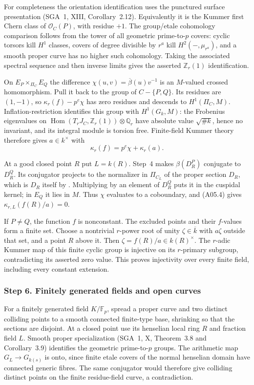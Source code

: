 \documentclass[11pt,a4paper]{article}
\begin{document}
For completeness the orientation identification uses the
punctured surface presentation (SGA~1, XIII, Corollary~2.12).
Equivalently it is the Kummer first Chern class of
$\mathcal O_C(P)$, with residue $+1$. The group/etale
cohomology comparison follows from the tower of all geometric
prime-to-$p$ covers: cyclic torsors kill $H^1$ classes, covers
of degree divisible by $r^a$ kill $H^2(-,\mu_{r^a})$, and a
smooth proper curve has no higher such cohomology. Taking the
associated spectral sequence and then inverse limits gives
the asserted $\mathbb Z_r(1)$ identification.

On $E_P\times_{\Pi_C}E_Q$ the difference
$\chi(u,v)=\overline\beta(u)v^{-1}$ is an $M$-valued
crossed homomorphism. Pull it back to the group of
$C-\{P,Q\}$. Its residues are $(1,-1)$, so
$\kappa_r(f)-p^e\chi$ has zero residues and descends to
$H^1(\Pi_C,M)$. Inflation-restriction identifies this group
with $H^1(G_k,M)$: the Frobenius eigenvalues on
$\operatorname{Hom}(T_rJ_C,\mathbb Z_r(1))\otimes\mathbb Q_r$
have absolute value $\sqrt{\#k}$, hence no invariant, and its
integral module is torsion free. Finite-field Kummer theory
therefore gives $a\in k^\times$ with
\[
 \kappa_r(f)=p^e\chi+\kappa_r(a). \tag{A05.4}
\]

At a good closed point $R$ put $L=k(R)$. Step~4 makes
$\beta(D_R^P)$ conjugate to $D_R^Q$. Its conjugator projects
to the normalizer in $\Pi_{C_L}$ of the proper section $D_R$, which is $D_R$
itself by \cite[Lemma~1.7]{ST2009}. Multiplying by an element
of $D_R^Q$ puts it in the cuspidal kernel; in $E_Q$ it lies
in $M$. Thus $\chi$ evaluates to a coboundary, and (A05.4)
gives $\kappa_{r,L}(f(R)/a)=0$.

If $P\ne Q$, the function $f$ is nonconstant. The excluded
points and their $f$-values form a finite set. Choose a
nontrivial $r$-power root of unity $\zeta\in\overline k$
with $a\zeta$ outside that set, and a point $R$ above it.
Then $\zeta=f(R)/a\in k(R)^\times$. The $r$-adic Kummer
map of this finite cyclic group is injective on its $r$-primary
subgroup, contradicting its asserted zero value. This proves
injectivity over every finite field, including every constant
extension.

\subsubsection*{Step 6. Finitely generated fields and open curves}
For a finitely generated field $K/\mathbb F_p$, spread a proper
curve and two distinct colliding points to a smooth connected
finite-type base, shrinking so that the sections are disjoint.
At a closed point use its henselian local ring $R$ and fraction
field $L$. Smooth proper specialization (SGA~1, X,
Theorem~3.8 and Corollary~3.9) identifies the geometric
prime-to-$p$ groups. The arithmetic map $G_L\to G_{k(s)}$
is onto, since finite etale covers of the normal henselian
domain have connected generic fibres. The same conjugator
would therefore give colliding distinct points on the finite
residue-field curve, a contradiction.
\end{document}
